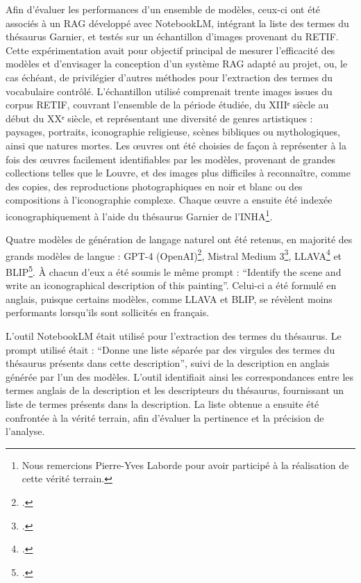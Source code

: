 Afin d’évaluer les performances d’un ensemble de modèles, ceux-ci ont été associés à un RAG développé avec NotebookLM, intégrant la liste des termes du thésaurus Garnier, et testés sur un échantillon d’images provenant du RETIF. Cette expérimentation avait pour objectif principal de mesurer l’efficacité des modèles et d’envisager la conception d’un système RAG adapté au projet, ou, le cas échéant, de privilégier d’autres méthodes pour l’extraction des termes du vocabulaire contrôlé. L’échantillon utilisé comprenait trente images issues du corpus RETIF, couvrant l’ensemble de la période étudiée, du XIIIᵉ siècle au début du XXᵉ siècle, et représentant une diversité de genres artistiques : paysages, portraits, iconographie religieuse, scènes bibliques ou mythologiques, ainsi que natures mortes. Les œuvres ont été choisies de façon à représenter à la fois des œuvres facilement identifiables par les modèles, provenant de grandes collections telles que le Louvre, et des images plus difficiles à reconnaître, comme des copies, des reproductions photographiques en noir et blanc ou des compositions à l’iconographie complexe. Chaque œuvre a ensuite été indexée iconographiquement à l’aide du thésaurus Garnier de l’INHA\footnote{Nous remercions Pierre-Yves Laborde pour avoir participé à la réalisation de cette vérité terrain.}.

Quatre modèles de génération de langage naturel ont été retenus, en majorité des grands modèles de langue : GPT-4 (OpenAI)\footcite{openaiGPT4}, Mistral Medium 3\footcite{mistralaiMediumNewLarge}, LLAVA\footcite{liuVisualInstructionTuning2023} et BLIP\footcite{liBLIPBootstrappingLanguageImage2022}. À chacun d’eux a été soumis le même prompt : “Identify the scene and write an iconographical description of this painting”. Celui-ci a été formulé en anglais, puisque certains modèles, comme LLAVA et BLIP, se révèlent moins performants lorsqu’ils sont sollicités en français.

L’outil NotebookLM était utilisé pour l’extraction des termes du thésaurus. Le prompt utilisé était : “Donne une liste séparée par des virgules des termes du thésaurus présents dans cette description”, suivi de la description en anglais générée par l’un des modèles. L’outil identifiait ainsi les correspondances entre les termes anglais de la description et les descripteurs du thésaurus, fournissant un liste de termes présents dans la description. La liste obtenue a ensuite été confrontée à la vérité terrain, afin d’évaluer la pertinence et la précision de l’analyse.

